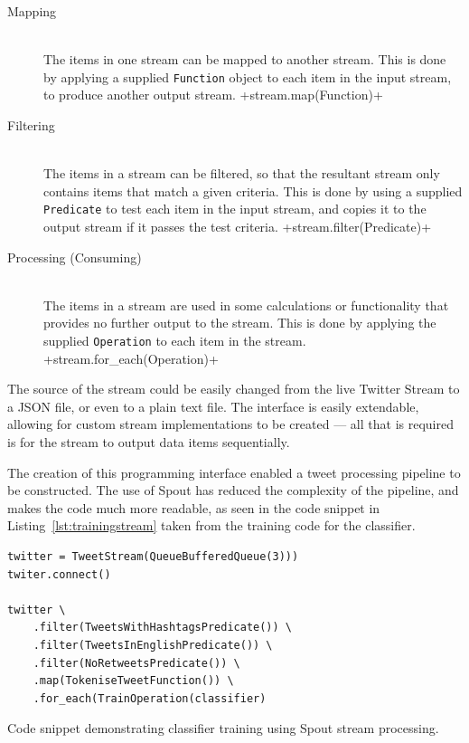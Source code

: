 \documentclass[11pt,a4paper]{report}
\begin{document}
\begin{description}
    \item[Mapping] \hfill \\
        The items in one stream can be mapped to another stream. This is done by applying a supplied \verb+Function+ object to each item in the input stream, to produce another output stream.
        +stream.map(Function)+
    \item[Filtering] \hfill \\
        The items in a stream can be filtered, so that the resultant stream only contains items that match a given criteria. This is done by using a supplied \verb+Predicate+ to test each item in the input stream, and copies it to the output stream if it passes the test criteria.
        +stream.filter(Predicate)+
    \item[Processing (Consuming)] \hfill \\
        The items in a stream are used in some calculations or functionality that provides no further output to the stream. This is done by applying the supplied \verb+Operation+ to each item in the stream.
        +stream.for_each(Operation)+
\end{description}

The source of the stream could be easily changed from the live Twitter Stream to a JSON file, or even to a plain text file. The interface is easily extendable, allowing for custom stream implementations to be created --- all that is required is for the stream to output data items sequentially.

The creation of this programming interface enabled a tweet processing pipeline to be constructed. The use of Spout has reduced the complexity of the pipeline, and makes the code much more readable, as seen in the code snippet in Listing~\ref{lst:trainingstream} taken from the training code for the classifier.

\begin{listing}[htpb]
    \begin{verbatim}
twitter = TweetStream(QueueBufferedQueue(3)))
twiter.connect()

twitter \
    .filter(TweetsWithHashtagsPredicate()) \
    .filter(TweetsInEnglishPredicate()) \
    .filter(NoRetweetsPredicate()) \
    .map(TokeniseTweetFunction()) \
    .for_each(TrainOperation(classifier)
    \end{verbatim}
    \caption{Code snippet demonstrating classifier training using Spout stream processing.}
    \label{lst:trainingstream}
\end{listing}
\end{document}
